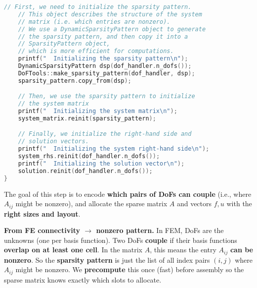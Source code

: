 \begin{enumerate}
\begin{lstlisting}[language=C++]
    // First, we need to initialize the sparsity pattern.
    // This object describes the structure of the system
    // matrix (i.e. which entries are nonzero).
    // We use a DynamicSparsityPattern object to generate
    // the sparsity pattern, and then copy it into a
    // SparsityPattern object,
    // which is more efficient for computations.
    printf("  Initializing the sparsity pattern\n");
    DynamicSparsityPattern dsp(dof_handler.n_dofs());
    DoFTools::make_sparsity_pattern(dof_handler, dsp);
    sparsity_pattern.copy_from(dsp);

    // Then, we use the sparsity pattern to initialize
    // the system matrix
    printf("  Initializing the system matrix\n");
    system_matrix.reinit(sparsity_pattern);

    // Finally, we initialize the right-hand side and
    // solution vectors.
    printf("  Initializing the system right-hand side\n");
    system_rhs.reinit(dof_handler.n_dofs());
    printf("  Initializing the solution vector\n");
    solution.reinit(dof_handler.n_dofs());
}\end{lstlisting}
    The goal of this step is to encode \textbf{which pairs of DoFs can couple} (i.e., where $A_{ij}$ might be nonzero), and allocate the sparse matrix $A$ and vectors $f, u$ with the \textbf{right sizes and layout}.

    \textcolor{Green3}{ \textbf{From FE connectivity $\rightarrow$ nonzero pattern.}} In FEM, DoFs are the unknowns (one per basis function). Two DoFs \textbf{couple} if their basis functions \textbf{overlap on at least one cell}. In the matrix $A$, this means the entry $A_{ij}$ \textbf{can be nonzero}. So the \textbf{sparsity pattern} is just the list of all index pairs $\left(i,j\right)$ where $A_{ij}$ might be nonzero. We \textbf{precompute} this once (fast) before assembly so the sparse matrix knows exactly which slots to allocate.


\end{enumerate}
